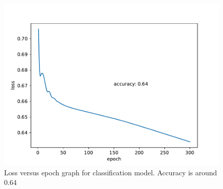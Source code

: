 \documentclass[11pt,a4paper]{article}
\begin{document}
	\begin{figure}[H]
		\centering
		\includegraphics[width=1\linewidth]{pics/fig8}
		\caption{Loss versus epoch graph for classification model. Accuracy is around 0.64}
		\label{fig:fig8}
	\end{figure}
	
	
	
	
	
\end{document}
